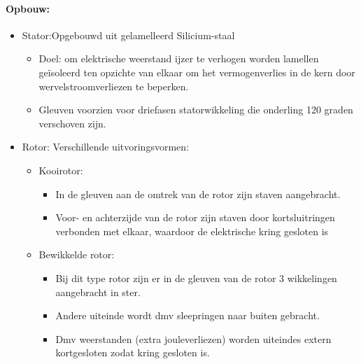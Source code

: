 \documentclass[12pt]{article}
\begin{document}
\paragraph{Opbouw:}
\begin{itemize}
    \item Stator:Opgebouwd uit gelamelleerd Silicium-staal\begin{itemize}
        \item Doel: om elektrische weerstand ijzer te verhogen worden lamellen geïsoleerd ten opzichte van elkaar om het vermogenverlies in de kern door wervelstroomverliezen te beperken.
        \item Gleuven voorzien voor driefasen statorwikkeling die onderling 120 graden verschoven zijn.
    \end{itemize}
    \item Rotor: Verschillende uitvoringsvormen:\begin{itemize}
        \item Kooirotor:\begin{itemize}
            \item In de gleuven aan de omtrek van de rotor zijn staven aangebracht. 
            \item Voor- en achterzijde van de rotor zijn staven door kortsluitringen verbonden met elkaar, waardoor de elektrische
            kring gesloten is
        \end{itemize}
        \item Bewikkelde rotor:\begin{itemize}
            \item Bij dit type rotor zijn er in de gleuven van de rotor 3 wikkelingen aangebracht in ster. 
            \item Andere uiteinde wordt dmv sleepringen naar buiten gebracht.
            \item Dmv weerstanden (extra jouleverliezen) worden uiteindes extern kortgesloten zodat kring gesloten is.
        \end{itemize}
    \end{itemize}
\end{itemize}
\end{document}
